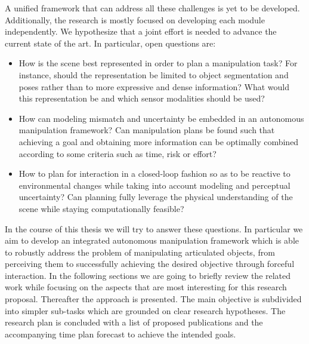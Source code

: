 \medskip 
A unified framework that can address all these challenges is yet to be developed. Additionally, the research is mostly focused on developing each module independently. We hypothesize that a joint effort is needed to advance the current state of the art. In particular, open questions are:
\begin{itemize}
\item How is the scene best represented in order to plan a manipulation task? For instance, should the representation be limited to object segmentation and poses rather than to more expressive and dense information? What would this representation be and which sensor modalities should be used? 
\item How can modeling mismatch and uncertainty be embedded in an autonomous manipulation framework? Can manipulation plans be found such that achieving a goal and obtaining more information can be optimally combined according to some criteria such as time, risk or effort?
\item How to plan for interaction in a closed-loop fashion so as to be reactive to environmental changes while taking into account modeling and perceptual uncertainty? Can planning fully leverage the physical understanding of the scene while staying computationally feasible?
\end{itemize}

In the course of this thesis we will try to answer these questions. In particular we aim to develop an integrated autonomous manipulation framework which is able to robustly address the problem of manipulating articulated objects, from perceiving them to successfully achieving the desired objective through forceful interaction. In the following sections we are going to briefly review the related work while focusing on the aspects that are most interesting for this research proposal. Thereafter the approach is presented. The main objective is subdivided into simpler sub-tasks which are grounded on clear research hypotheses. The research plan is concluded with a list of proposed publications and the accompanying time plan forecast to achieve the intended goals. 
